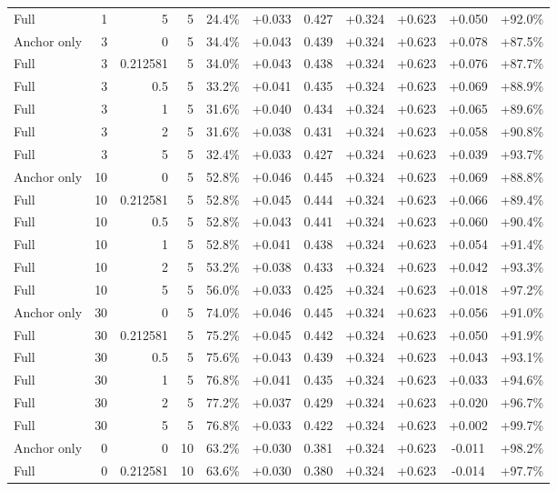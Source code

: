 \begin{table}[htbp]
\begin{tabular}{lrrrccccccc}
Full & 1 & 5 & 5 & 24.4\% & +0.033 & 0.427 & +0.324 & +0.623 & +0.050 & +92.0\% \\
Anchor only & 3 & 0 & 5 & 34.4\% & +0.043 & 0.439 & +0.324 & +0.623 & +0.078 & +87.5\% \\
Full & 3 & 0.212581 & 5 & 34.0\% & +0.043 & 0.438 & +0.324 & +0.623 & +0.076 & +87.7\% \\
Full & 3 & 0.5 & 5 & 33.2\% & +0.041 & 0.435 & +0.324 & +0.623 & +0.069 & +88.9\% \\
Full & 3 & 1 & 5 & 31.6\% & +0.040 & 0.434 & +0.324 & +0.623 & +0.065 & +89.6\% \\
Full & 3 & 2 & 5 & 31.6\% & +0.038 & 0.431 & +0.324 & +0.623 & +0.058 & +90.8\% \\
Full & 3 & 5 & 5 & 32.4\% & +0.033 & 0.427 & +0.324 & +0.623 & +0.039 & +93.7\% \\
Anchor only & 10 & 0 & 5 & 52.8\% & +0.046 & 0.445 & +0.324 & +0.623 & +0.069 & +88.8\% \\
Full & 10 & 0.212581 & 5 & 52.8\% & +0.045 & 0.444 & +0.324 & +0.623 & +0.066 & +89.4\% \\
Full & 10 & 0.5 & 5 & 52.8\% & +0.043 & 0.441 & +0.324 & +0.623 & +0.060 & +90.4\% \\
Full & 10 & 1 & 5 & 52.8\% & +0.041 & 0.438 & +0.324 & +0.623 & +0.054 & +91.4\% \\
Full & 10 & 2 & 5 & 53.2\% & +0.038 & 0.433 & +0.324 & +0.623 & +0.042 & +93.3\% \\
Full & 10 & 5 & 5 & 56.0\% & +0.033 & 0.425 & +0.324 & +0.623 & +0.018 & +97.2\% \\
Anchor only & 30 & 0 & 5 & 74.0\% & +0.046 & 0.445 & +0.324 & +0.623 & +0.056 & +91.0\% \\
Full & 30 & 0.212581 & 5 & 75.2\% & +0.045 & 0.442 & +0.324 & +0.623 & +0.050 & +91.9\% \\
Full & 30 & 0.5 & 5 & 75.6\% & +0.043 & 0.439 & +0.324 & +0.623 & +0.043 & +93.1\% \\
Full & 30 & 1 & 5 & 76.8\% & +0.041 & 0.435 & +0.324 & +0.623 & +0.033 & +94.6\% \\
Full & 30 & 2 & 5 & 77.2\% & +0.037 & 0.429 & +0.324 & +0.623 & +0.020 & +96.7\% \\
Full & 30 & 5 & 5 & 76.8\% & +0.033 & 0.422 & +0.324 & +0.623 & +0.002 & +99.7\% \\
Anchor only & 0 & 0 & 10 & 63.2\% & +0.030 & 0.381 & +0.324 & +0.623 & -0.011 & +98.2\% \\
Full & 0 & 0.212581 & 10 & 63.6\% & +0.030 & 0.380 & +0.324 & +0.623 & -0.014 & +97.7\% \\

\end{tabular}
\end{table}
